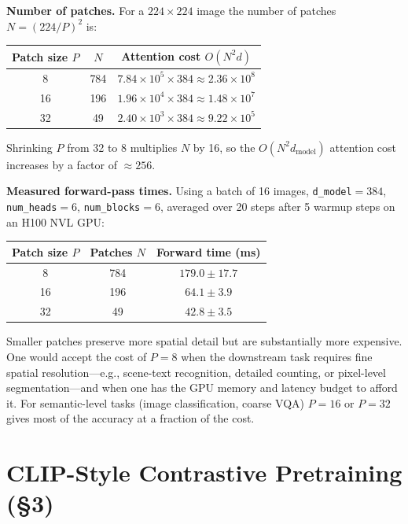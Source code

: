 \documentclass[11pt]{article}
\begin{document}
\textbf{Number of patches.}
For a $224\times 224$ image the number of patches $N = (224/P)^2$ is:
\begin{center}
\begin{tabular}{ccc}
\toprule
Patch size $P$ & $N$ & Attention cost $O(N^2 d)$ \\
\midrule
8  & 784  & $7.84 \times 10^5 \times 384 \approx 2.36\times10^8$ \\
16 & 196  & $1.96 \times 10^4 \times 384 \approx 1.48\times10^7$ \\
32 & 49   & $2.40 \times 10^3 \times 384 \approx 9.22\times10^5$ \\
\bottomrule
\end{tabular}
\end{center}
Shrinking $P$ from 32 to 8 multiplies $N$ by 16, so the $O(N^2 d_{\mathrm{model}})$
attention cost increases by a factor of $\approx 256$.

\textbf{Measured forward-pass times.}
Using a batch of 16 images,
\texttt{d\_model}$=384$, \texttt{num\_heads}$=6$, \texttt{num\_blocks}$=6$,
averaged over 20 steps after 5 warmup steps on an H100 NVL GPU:
\begin{center}
\begin{tabular}{ccc}
\toprule
Patch size $P$ & Patches $N$ & Forward time (ms) \\
\midrule
8  & 784 & $179.0 \pm 17.7$ \\
16 & 196 & $64.1  \pm 3.9$  \\
32 & 49  & $42.8  \pm 3.5$  \\
\bottomrule
\end{tabular}
\end{center}

Smaller patches preserve more spatial detail but are substantially more
expensive. One would accept the cost of $P=8$ when the downstream task
requires fine spatial resolution---e.g., scene-text recognition, detailed
counting, or pixel-level segmentation---and when one has the GPU memory and
latency budget to afford it. For semantic-level tasks (image classification,
coarse VQA) $P=16$ or $P=32$ gives most of the accuracy at a fraction of
the cost.

\section{CLIP-Style Contrastive Pretraining (\S{}3)}
\end{document}

